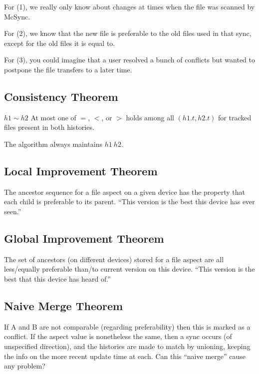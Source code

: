 \documentclass{book}
\begin{document}
For (1), we really only know about changes at times when the file was scanned by McSync.

For (2), we know that the new file is preferable to the old files used in that sync, except for the old files it is equal to.

For (3), you could imagine that a user resolved a bunch of conflicts but wanted to postpone the file transfers to a later time.



\subsection{Consistency Theorem}

$h1 \sim h2$    At most one of $=$, $<$, or $>$ holds among all $(h1.t, h2.t)$ for tracked files present in both histories.

The algorithm always maintains $h1 ~ h2$.



\subsection{Local Improvement Theorem}

The ancestor sequence for a file aspect on a given device has the property that each child is preferable to its parent.  ``This version is the best this device has ever seen.''



\subsection{Global Improvement Theorem}

The set of ancestors (on different devices) stored for a file aspect are all less/equally preferable than/to current version on this device.  ``This version is the best that this device has heard of.''



\subsection{Naive Merge Theorem}

If A and B are not comparable (regarding preferability) then this is marked as a conflict.  If the aspect value is nonetheless the same, then a sync occurs (of unspecified direction), and the histories are made to match by unioning, keeping the info on the more recent update time at each.
Can this ``naive merge'' cause any problem?
\end{document}
